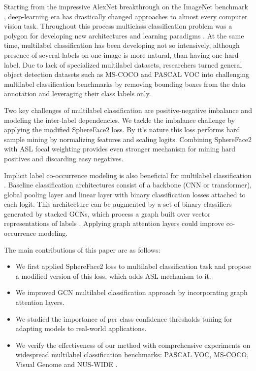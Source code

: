 \documentclass[runningheads]{llncs}
\begin{document}
Starting from the impressive AlexNet \cite{alexnet} breakthrough on the ImageNet benchmark \cite{imagenet_cvpr09},
deep-learning era has drastically changed approaches to almost every computer vision task.
Throughout this process multiclass classification problem was a polygon for developing new
architectures \cite{He2016DeepRL, Howard2019SearchingFM, Tan2019EfficientNetRM} and learning paradigms \cite{chen2020simple, NEURIPS2020_d89a66c7, he2019moco}.
At the same time, multilabel classification has been developing not so intensively, although presence of several
labels on one image is more natural, than having one hard label. Due to lack of specialized multilabel datasets, researchers
turned general object detection datasets such as MS-COCO \cite{Lin2014MicrosoftCC} and PASCAL VOC \cite{Everingham2014ThePV} into
challenging multilabel classification benchmarks by removing bounding boxes from the data annotation and
leveraging their class labels only.

Two key challenges of multilabel classification are positive-negative imbalance and
modeling the inter-label dependencies. We tackle the imbalance challenge by applying
the modified SphereFace2\cite{Wen2021SphereFace2BC} loss. By it's nature this loss performs hard sample
mining by normalizing features and scaling logits. Combining SphereFace2 with ASL\cite{Baruch2021AsymmetricLF} focal weighting
provides even stronger mechanism for mining hard positives and discarding easy negatives.

Implicit label co-occurrence modeling is also beneficial for multilabel
classification \cite{Liu2021Query2LabelAS,ridnik2021mldecoder,Chen2019MultiLabelIR}.
Baseline classification architectures consist of a backbone (CNN or transformer), global pooling layer
and linear layer with binary classification losses attached to each logit. This architecture
can be augmented by a set of binary classifiers generated by stacked GCNs, which process a graph
built over vector representations of labels \cite{Chen2019MultiLabelIR}. Applying graph attention layers could improve
co-occurrence modeling.

The main contributions of this paper are as follows:
\begin{itemize}
  \item We first applied SphereFace2\cite{Wen2021SphereFace2BC} loss to multilabel classification task and
  propose a modified version of this loss, which adds ASL\cite{Baruch2021AsymmetricLF} mechanism to it.
  \item We improved GCN\cite{Chen2019MultiLabelIR} multilabel classification approach by incorporating graph attention layers.
  \item We studied the importance of per class confidence thresholds tuning for adapting models to real-world applications.
  \item We verify the effectiveness of our method with comprehensive experiments
  on widespread multilabel classification benchmarks: PASCAL VOC, MS-COCO, Visual Genome \cite{Krishna2016VisualGC}
  and NUS-WIDE \cite{Chua2009NUSWIDEAR}.
\end{itemize}
\end{document}
